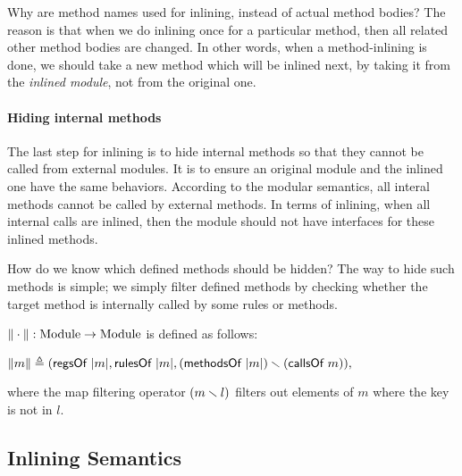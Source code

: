 Why are method names used for inlining, instead of actual method
bodies? The reason is that when we do inlining once for a particular
method, then all related other method bodies are changed. In other
words, when a method-inlining is done, we should take a new method
which will be inlined next, by taking it from the \emph{inlined
  module}, not from the original one.

\paragraph{Hiding internal methods}

The last step for inlining is to hide internal methods so that they
cannot be called from external modules. It is to ensure an original
module and the inlined one have the same behaviors. According to the
modular semantics, all interal methods cannot be called by external
methods. In terms of inlining, when all internal calls are inlined,
then the module should not have interfaces for these inlined methods.

How do we know which defined methods should be hidden? The way to hide
such methods is simple; we simply filter defined methods by checking
whether the target method is internally called by some rules or
methods.

\begin{definition}
  \label{def-inlineF}
  $\| \cdot \| : \textrm{Module} \to \textrm{Module}$ is defined
  as follows:
  \begin{center}
    \begin{math}
      \| m \| \triangleq
      (\textsf{regsOf}\ | m |,
      \textsf{rulesOf}\ | m |,
      (\textsf{methodsOf}\ | m |) \smallsetminus{} (\textsf{callsOf}\ m)),
    \end{math}
  \end{center}
\end{definition}
where the map filtering operator $(m \smallsetminus{} l)$ filters out
elements of $m$ where the key is not in $l$.

\subsection{Inlining Semantics}


